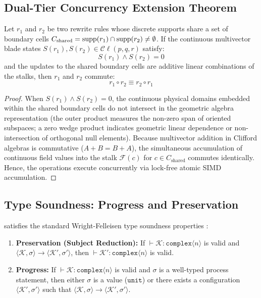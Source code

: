 \subsection{Dual-Tier Concurrency Extension Theorem}
\begin{theorem}
\label{thm:dualtier_commutativity}
Let $r_1$ and $r_2$ be two rewrite rules whose discrete supports share a set of boundary cells $C_{\text{shared}} = \operatorname{supp}(r_1) \cap \operatorname{supp}(r_2) \neq \emptyset$. If the continuous multivector blade states $S(r_1), S(r_2) \in \mathcal{C}\ell(p,q,r)$ satisfy:
\begin{equation}
    S(r_1) \wedge S(r_2) = 0
\end{equation}
and the updates to the shared boundary cells are additive linear combinations of the stalks, then $r_1$ and $r_2$ commute:
\begin{equation}
    r_1 \circ r_2 \equiv r_2 \circ r_1
\end{equation}
\end{theorem}

\begin{proof}
When $S(r_1) \wedge S(r_2) = 0$, the continuous physical domains embedded within the shared boundary cells do not intersect in the geometric algebra representation (the outer product measures the non-zero span of oriented subspaces; a zero wedge product indicates geometric linear dependence or non-intersection of orthogonal null elements). Because multivector addition in Clifford algebras is commutative ($A + B = B + A$), the simultaneous accumulation of continuous field values into the stalk $\mathcal{F}(c)$ for $c \in C_{\text{shared}}$ commutes identically. Hence, the operations execute concurrently via lock-free atomic SIMD accumulation.
\end{proof}

\subsection{Type Soundness: Progress and Preservation}
\begin{theorem}
\ToposLang{} satisfies the standard Wright-Felleisen type soundness properties \cite{wright1994syntactic}:
\begin{enumerate}
    \item \textbf{Preservation (Subject Reduction):} If $\vdash \mathcal{K} : \texttt{complex}\langle n \rangle$ is valid and $\langle \mathcal{K}, \sigma \rangle \longrightarrow \langle \mathcal{K}', \sigma' \rangle$, then $\vdash \mathcal{K}' : \texttt{complex}\langle n \rangle$ is valid.
    \item \textbf{Progress:} If $\vdash \mathcal{K} : \texttt{complex}\langle n \rangle$ is valid and $\sigma$ is a well-typed process statement, then either $\sigma$ is a value ($\texttt{unit}$) or there exists a configuration $\langle \mathcal{K}', \sigma' \rangle$ such that $\langle \mathcal{K}, \sigma \rangle \longrightarrow \langle \mathcal{K}', \sigma' \rangle$.
\end{enumerate}
\end{theorem}


